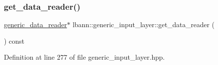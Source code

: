\subsubsection{\texorpdfstring{get\+\_\+data\+\_\+reader()}{get\_data\_reader()}\hspace{0.1cm}{\footnotesize\ttfamily [2/2]}}
{\footnotesize\ttfamily \hyperlink{classlbann_1_1generic__data__reader}{generic\+\_\+data\+\_\+reader}$\ast$ lbann\+::generic\+\_\+input\+\_\+layer\+::get\+\_\+data\+\_\+reader (\begin{DoxyParamCaption}{ }\end{DoxyParamCaption}) const\hspace{0.3cm}{\ttfamily [inline]}}



Definition at line 277 of file generic\+\_\+input\+\_\+layer.\+hpp.


